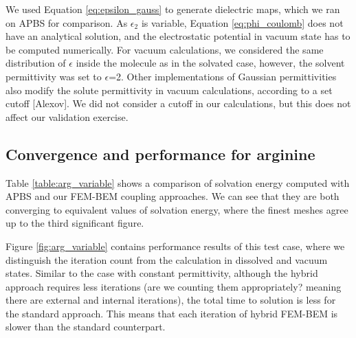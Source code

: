We used Equation \eqref{eq:epsilon_gauss} to generate dielectric maps, which we ran on APBS for comparison. 
As $\epsilon_2$ is variable, Equation \eqref{eq:phi_coulomb} does not have an analytical solution, and the electrostatic potential in vacuum state has to be computed numerically.
For vacuum calculations, we considered the same distribution of $\epsilon$ inside the molecule as in the solvated case, however, the solvent permittivity was set to $\epsilon$=2. 
Other implementations of Gaussian permittivities also modify the solute permittivity in vacuum calculations, according to a set cutoff [Alexov]. 
We did not consider a cutoff in our calculations, but this does not affect our validation exercise. 

\subsection*{\sffamily \large Convergence and performance for arginine}

Table \ref{table:arg_variable} shows a comparison of solvation energy computed with APBS and our FEM-BEM coupling approaches. We can see that they are both converging to equivalent values of solvation energy, where the finest meshes agree up to the third significant figure.

Figure \ref{fig:arg_variable} contains performance results of this test case, where we distinguish the iteration count from the calculation in dissolved and vacuum states. 
Similar to the case with constant permittivity, although the hybrid approach requires less iterations (are we counting them appropriately? meaning there are external and internal iterations), the total time to solution is less for the standard approach. This means that each iteration of hybrid FEM-BEM is slower than the standard counterpart.


